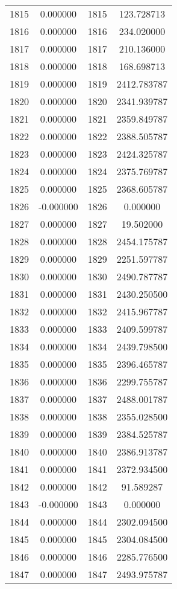 \documentclass[12pt]{article}
\begin{document}
\begin{longtable}{@{}cccc@{}}
1815 & 0.000000 & 1815 & 123.728713 \\
1816 & 0.000000 & 1816 & 234.020000 \\
1817 & 0.000000 & 1817 & 210.136000 \\
1818 & 0.000000 & 1818 & 168.698713 \\
1819 & 0.000000 & 1819 & 2412.783787 \\
1820 & 0.000000 & 1820 & 2341.939787 \\
1821 & 0.000000 & 1821 & 2359.849787 \\
1822 & 0.000000 & 1822 & 2388.505787 \\
1823 & 0.000000 & 1823 & 2424.325787 \\
1824 & 0.000000 & 1824 & 2375.769787 \\
1825 & 0.000000 & 1825 & 2368.605787 \\
1826 & -0.000000 & 1826 & 0.000000 \\
1827 & 0.000000 & 1827 & 19.502000 \\
1828 & 0.000000 & 1828 & 2454.175787 \\
1829 & 0.000000 & 1829 & 2251.597787 \\
1830 & 0.000000 & 1830 & 2490.787787 \\
1831 & 0.000000 & 1831 & 2430.250500 \\
1832 & 0.000000 & 1832 & 2415.967787 \\
1833 & 0.000000 & 1833 & 2409.599787 \\
1834 & 0.000000 & 1834 & 2439.798500 \\
1835 & 0.000000 & 1835 & 2396.465787 \\
1836 & 0.000000 & 1836 & 2299.755787 \\
1837 & 0.000000 & 1837 & 2488.001787 \\
1838 & 0.000000 & 1838 & 2355.028500 \\
1839 & 0.000000 & 1839 & 2384.525787 \\
1840 & 0.000000 & 1840 & 2386.913787 \\
1841 & 0.000000 & 1841 & 2372.934500 \\
1842 & 0.000000 & 1842 & 91.589287 \\
1843 & -0.000000 & 1843 & 0.000000 \\
1844 & 0.000000 & 1844 & 2302.094500 \\
1845 & 0.000000 & 1845 & 2304.084500 \\
1846 & 0.000000 & 1846 & 2285.776500 \\
1847 & 0.000000 & 1847 & 2493.975787 \\

\end{longtable}
\end{document}
